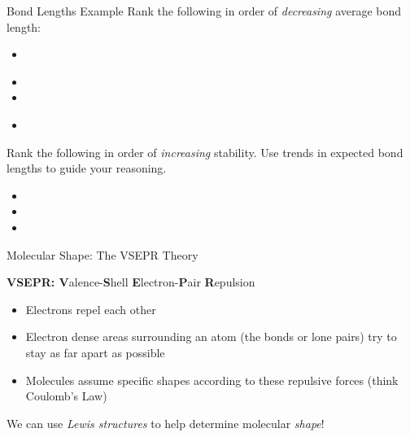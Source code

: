 \documentclass[notes=hide]{beamer}
\begin{document}
\begin{frame}[t]{Bond Lengths Example}
	Rank the following in order of \emph{decreasing} average bond length:

	\begin{itemize}
		\item {}~  \mode<presentation>{\qquad
			\alt<5->{\emph{\SI{92}{\pico\meter}}}{}}
		\item {}  \mode<presentation>{\qquad
			\alt<4->{\emph{\SI{127}{\pico\meter}}}{}}
		\item {}  \mode<presentation>{\qquad
			\alt<3->{\emph{\SI{141}{\pico\meter}}}{}}
		\item {}~   \mode<presentation>{\qquad
			\alt<2->{\emph{\SI{161}{\pico\meter}}}{}}
	\end{itemize}
\end{frame}

\begin{onyourown}{1em}
	Rank the following in order of \emph{increasing} stability. Use trends
	in expected bond lengths to guide your reasoning.

	\begin{itemize}
		\item {}
		\item {}
		\item {}
	\end{itemize}
\end{onyourown}

\begin{frame}{Molecular Shape: The VSEPR Theory}

	\textbf{VSEPR: V}alence-\textbf{S}hell \textbf{E}lectron-\textbf{P}air
	\textbf{R}epulsion

	\begin{itemize}
		\item Electrons repel each other
		\item Electron dense areas surrounding an atom (the bonds or
			lone pairs) try to stay as far apart as possible
		\item Molecules assume specific shapes according to these
			repulsive forces (think Coulomb's Law)
	\end{itemize}

	\pause
	\begin{center}
		We can use \emph{Lewis structures} to help determine
		molecular \emph{shape}!
	\end{center}
\end{frame}
\end{document}
